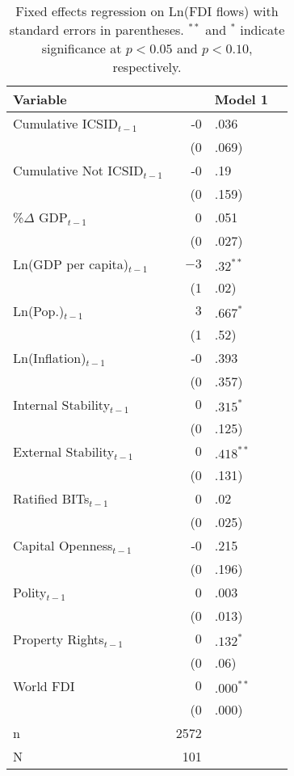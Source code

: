 \begin{table}[ht]
\centering
\begingroup\footnotesize
\begin{tabular}{lr@{}lr@{}}
 Variable && Model 1 \\ 
  \hline
\hline
Cumulative ICSID$_{t-1}$ & -0&.036 \\ 
   & (0&.069) \\ 
  Cumulative Not ICSID$_{t-1}$ & -0&.19 \\ 
   & (0&.159) \\ 
  \%$\Delta$ GDP$_{t-1}$ & 0&.051 \\ 
   & (0&.027) \\ 
  Ln(GDP per capita)$_{t-1}$ & $-3$&$.32^{\ast\ast}$ \\ 
   & (1&.02) \\ 
  Ln(Pop.)$_{t-1}$ & $3$&$.667^{\ast}$ \\ 
   & (1&.52) \\ 
  Ln(Inflation)$_{t-1}$ & -0&.393 \\ 
   & (0&.357) \\ 
  Internal Stability$_{t-1}$ & $0$&$.315^{\ast}$ \\ 
   & (0&.125) \\ 
  External Stability$_{t-1}$ & $0$&$.418^{\ast\ast}$ \\ 
   & (0&.131) \\ 
  Ratified BITs$_{t-1}$ & 0&.02 \\ 
   & (0&.025) \\ 
  Capital Openness$_{t-1}$ & -0&.215 \\ 
   & (0&.196) \\ 
  Polity$_{t-1}$ & 0&.003 \\ 
   & (0&.013) \\ 
  Property Rights$_{t-1}$ & $0$&$.132^{\ast}$ \\ 
   & (0&.06) \\ 
  World FDI & $0$&$.000^{\ast\ast}$ \\ 
   & (0&.000) \\ 
   \hline
n & 2572 \\ 
  N & 101 \\ 
   \hline
\hline
\end{tabular}
\endgroup
\caption{Fixed effects regression on Ln(FDI flows) with standard errors in parentheses. $^{**}$ and $^{*}$ indicate significance at $p< 0.05 $ and $p< 0.10 $, respectively.} 
\end{table}
